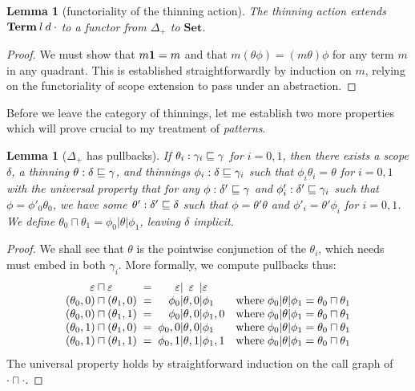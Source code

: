 \documentclass{jfp1}
\newtheorem{lemma}[theorem]{Lemma}
\newcommand{\emp}{\varepsilon}
\newcommand{\Set}{\textbf{Set}}
\begin{document}
\begin{lemma}[functoriality of the thinning action]
 The thinning action extends $\mathbf{Term}\:l\:d\:\cdot$ to a functor from $\Delta_+$ to $\Set$.
\end{lemma}
\begin{proof}
  We must show that $m\mathbf{1} = m$ and that $m(\theta\phi) = (m\theta)\phi$ for any term $m$ in any quadrant.
  This is established straightforwardly by induction on $m$, relying on the functoriality of scope extension
  to pass under an abstraction.
\end{proof}

Before we leave the category of thinnings, let me establish two more properties which
will prove crucial to my treatment of \emph{patterns}.

\newcommand{\pb}[2]{#1 \sqcap #2}
\newcommand{\cp}[2]{#1 \sqcup #2}
\begin{lemma}[$\Delta_+$ has pullbacks]
  If $\theta_i : \gamma_i\sqsubseteq\gamma$ for $i=0,1$, then there exists a
  scope $\delta$, a thinning $\theta : \delta\sqsubseteq\gamma$, and
  thinnings $\phi_i : \delta\sqsubseteq\gamma_i$ such that
  $\phi_i\theta_i = \theta$  for $i=0,1$ with the universal property that
  for any $\phi:\delta'\sqsubseteq\gamma$ and $\phi'_i : \delta'\sqsubseteq\gamma_i$ such that
  $\phi=\phi'_0\theta_0$, we have some $\theta' : \delta'\sqsubseteq\delta$
  such that
  $\phi=\theta'\theta$ and
  $\phi'_i = \theta'\phi_i$ for $i=0,1$. We define
  $\pb{\theta_0}{\theta_1} = \phi_0 | \theta | \phi_1$,
  leaving $\delta$ implicit.
\end{lemma}
\begin{proof}
  We shall see that $\theta$ is the pointwise conjunction of the $\theta_i$,
  which needs must embed in both $\gamma_i$. More formally, we compute pullbacks thus:
  \[\begin{array}{c@{\;\;=\;\;}r@{|}c@{|}ll}
    \pb{\emp}{\emp} & \emp&\emp&\emp & \\
    \pb{(\theta_0,0)}{(\theta_1,0)} & \phi_0&\theta,0&\phi_1
      & \mbox{where}\;\phi_0|\theta|\phi_1 = \pb{\theta_0}{\theta_1} \\                                     
    \pb{(\theta_0,0)}{(\theta_1,1)} & \phi_0&\theta,0&\phi_1,0
      & \mbox{where}\;\phi_0|\theta|\phi_1 = \pb{\theta_0}{\theta_1} \\
    \pb{(\theta_0,1)}{(\theta_1,0)} & \phi_0,0&\theta,0&\phi_1
      & \mbox{where}\;\phi_0|\theta|\phi_1 = \pb{\theta_0}{\theta_1} \\
    \pb{(\theta_0,1)}{(\theta_1,1)} & \phi_0,1&\theta,1&\phi_1,1
      & \mbox{where}\;\phi_0|\theta|\phi_1 = \pb{\theta_0}{\theta_1} \\
    \end{array}\]
  The universal property holds by straightforward induction on the call graph
  of $\pb\cdot\cdot$.
\end{proof}
\end{document}
